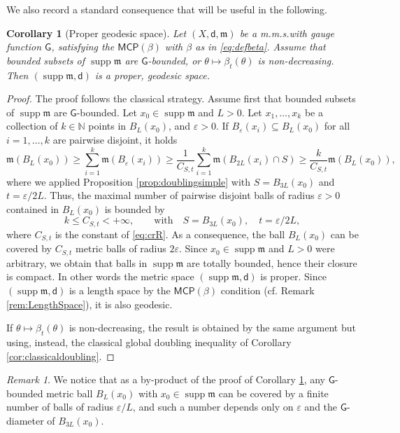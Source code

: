 \documentclass[11pt,a4paper]{article}
\theoremstyle{plain}
\newtheorem{corollary}[theorem]{Corollary}
\theoremstyle{definition}
\theoremstyle{remark}
\newtheorem{remark}[theorem]{Remark}
\numberwithin{equation}{section}
\newcommand{\N}{\mathbb{N}} %
\DeclareMathOperator{\supp}{\mathrm{supp}}
\newcommand{\MCP}{\mathsf{MCP}}
\newcommand{\mm}{\mathfrak m}
\newcommand{\sfd}{\mathsf d}
\newcommand{\sfG}{\mathsf G}
\begin{document}
We also record a standard consequence that will be useful in the following.

\begin{corollary}[Proper geodesic space]\label{cor:totallyboundedclassic}
Let $(X,\sfd,\mm)$ be a m.m.s.\@ with gauge function $\sfG$, satisfying the $\MCP(\beta)$ with $\beta$ as in \eqref{eq:defbeta}. Assume that bounded subsets of $\supp\mm$ are $\sfG$-bounded, or $\theta\mapsto\beta_t(\theta)$ is non-decreasing. Then $(\supp\mm,\sfd)$ is a proper, geodesic space.
\end{corollary}
\begin{proof}
The proof follows the classical strategy. Assume first that bounded subsets of $\supp\mm$ are $\sfG$-bounded. Let $x_0\in\supp\mm$ and $L>0$. Let $x_1,\dots,x_k$ be a collection of $k\in \N$ points in $B_L(x_0)$, and $\varepsilon>0$. If $B_\varepsilon(x_i)\subseteq B_{L}(x_0)$ for all $i=1,\dots,k$  are pairwise disjoint, it holds
\begin{equation}
\mm(B_{L}(x_0)) \geq \sum_{i=1}^k \mm(B_{\varepsilon}(x_i))\geq \frac{1}{C_{S,t}} \sum_{i=1}^k \mm(B_{2L}(x_i)\cap S)\geq \frac{k}{C_{S,t}} \mm(B_{L}(x_0)),
\end{equation}
where we applied Proposition \ref{prop:doublingsimple} with $S=B_{3L}(x_0)$ and $t=\varepsilon/2L$. Thus, the maximal number of pairwise disjoint balls of radius $\varepsilon>0$ contained in $B_{L}(x_0)$ is bounded by
\begin{equation}
k \leq C_{S,t}<+\infty, \qquad\text{with}\quad S= B_{3L}(x_0),\quad t=\varepsilon/2L,
\end{equation}
where $C_{S,t}$ is the constant of \eqref{eq:crR}. As a consequence, the ball $B_{L}(x_0)$ can be covered by $C_{S,t}$ metric balls of radius $2\varepsilon$. Since $x_0\in\supp\mm$ and $L>0$ were arbitrary, we obtain that  balls in $\supp\mm$ are totally bounded, hence their closure is compact. In other words the metric space $(\supp\mm,\sfd)$ is proper. Since $(\supp\mm,\sfd)$ is a length space by the $\MCP(\beta)$ condition (cf. Remark \ref{rem:LengthSpace}), it is also geodesic.

If $\theta\mapsto\beta_t(\theta)$ is non-decreasing, the result is obtained by the same argument but using, instead, the classical global doubling inequality of Corollary \ref{cor:classicaldoubling}.
\end{proof}

\begin{remark}\label{rmk:totallybdduniform}
We notice that as a by-product of the proof of Corollary \ref{cor:totallyboundedclassic}, any $\sfG$-bounded metric ball $B_L(x_0)$ with $x_0\in\supp\mm$ can be covered by a finite number of balls of radius $\varepsilon/L$, and such a number depends only on $\varepsilon$ and the $\sfG$-diameter of $B_{3L}(x_0)$.
\end{remark}
\end{document}
